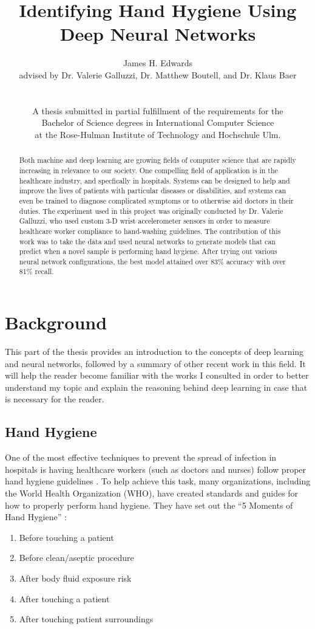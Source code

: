 \documentclass[]{report}
\title{Identifying Hand Hygiene Using Deep Neural Networks}
\author{James H. Edwards \\ 
	advised by Dr. Valerie Galluzzi, Dr. Matthew Boutell, and Dr. Klaus Baer\\
	\\
	\\
	A thesis submitted in partial fulfillment of the requirements for the \\
	Bachelor of Science degrees in International Computer Science \\
	at the Rose-Hulman Institute of Technology and Hochschule Ulm.}
\begin{document}
\maketitle
\tableofcontents

\begin{abstract}
	Both machine and deep learning are growing fields of computer science that are rapidly increasing in relevance to our society. One compelling field of application is in the healthcare industry, and specfically in hospitals. Systems can be designed to help and improve the lives of patients with particular diseases or disabilities, and systems can even be trained to diagnose complicated symptoms or to otherwise aid doctors in their duties. The experiment used in this project was originally conducted by Dr. Valerie Galluzzi, who used custom 3-D wrist accelerometer sensors in order to measure healthcare worker compliance to hand-washing guidelines. The contribution of this work was to take the data and used neural networks to generate models that can predict when a novel sample is performing hand hygiene. After trying out various neural network configurations, the best model attained over 83\% accuracy with over 81\% recall.
\end{abstract}

\chapter{Background}

This part of the thesis provides an introduction to the concepts of deep learning and neural networks, followed by a summary of other recent work in this field. It will help the reader become familiar with the works I consulted in order to better understand my topic and explain the reasoning behind deep learning in case that is necessary for the reader.


\section{Hand Hygiene}

One of the most effective techniques to prevent the spread of infection in hospitals is having healthcare workers (such as doctors and nurses) follow proper hand hygiene guidelines \cite{Galluzzi}. To help achieve this task, many organizations, including the World Health Organization (WHO), have created standards and guides for how to properly perform hand hygiene. They have set out the ``5 Moments of Hand Hygiene'' \cite{WHO}:
\begin{enumerate}
	\item Before touching a patient
	\item Before clean/aseptic procedure
	\item After body fluid exposure risk
	\item After touching a patient
	\item After touching patient surroundings
\end{enumerate}
\end{document}
